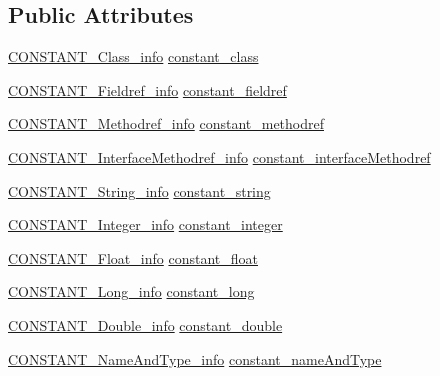 \subsection*{Public Attributes}
\begin{DoxyCompactItemize}
\item 
\hyperlink{structs_8hpp_afce1973b88cef62148562ed37fbbdfec}{C\+O\+N\+S\+T\+A\+N\+T\+\_\+\+Class\+\_\+info} \hyperlink{unioncp__info__u_aa80a68381f1daf2ccf6ac2ee5ce9b602}{constant\+\_\+class}
\item 
\hyperlink{structs_8hpp_a5b79c4752ea4a4e4880f374239e23104}{C\+O\+N\+S\+T\+A\+N\+T\+\_\+\+Fieldref\+\_\+info} \hyperlink{unioncp__info__u_a18be3ffc26ebc8887f507dd9e6cb756c}{constant\+\_\+fieldref}
\item 
\hyperlink{structs_8hpp_a11dfb795f76c8ae500e5652924ba7289}{C\+O\+N\+S\+T\+A\+N\+T\+\_\+\+Methodref\+\_\+info} \hyperlink{unioncp__info__u_a1b1c3cd5733f2a29bb0e2814b67f168d}{constant\+\_\+methodref}
\item 
\hyperlink{structs_8hpp_a5d8a806561391610f7092cae2e9fbdca}{C\+O\+N\+S\+T\+A\+N\+T\+\_\+\+Interface\+Methodref\+\_\+info} \hyperlink{unioncp__info__u_a15e8972d564add1f129d469b54efb8b6}{constant\+\_\+interface\+Methodref}
\item 
\hyperlink{structs_8hpp_a98fe2dcb4f443548bca1e1ba4750551d}{C\+O\+N\+S\+T\+A\+N\+T\+\_\+\+String\+\_\+info} \hyperlink{unioncp__info__u_acd87a20b30ed9024d98239c3cd14b0f9}{constant\+\_\+string}
\item 
\hyperlink{structs_8hpp_a787b138703e5fbe6f5899de13d7dcb63}{C\+O\+N\+S\+T\+A\+N\+T\+\_\+\+Integer\+\_\+info} \hyperlink{unioncp__info__u_aef67ff0a71fe8f3a8a6f276c0e177c9c}{constant\+\_\+integer}
\item 
\hyperlink{structs_8hpp_af49965517a6dbed7ccaeeae09beb251a}{C\+O\+N\+S\+T\+A\+N\+T\+\_\+\+Float\+\_\+info} \hyperlink{unioncp__info__u_a14b943c747f6aa0fe799739608439fd9}{constant\+\_\+float}
\item 
\hyperlink{structs_8hpp_a0664b73f95a5ba329c2f70bf22c70cb8}{C\+O\+N\+S\+T\+A\+N\+T\+\_\+\+Long\+\_\+info} \hyperlink{unioncp__info__u_aac563b3b1991dd783a7dcf8734cc7b68}{constant\+\_\+long}
\item 
\hyperlink{structs_8hpp_a2c42e32589ba5c1bb09cabcadcb0f96c}{C\+O\+N\+S\+T\+A\+N\+T\+\_\+\+Double\+\_\+info} \hyperlink{unioncp__info__u_a564a2f753c2487b102b95c993596a103}{constant\+\_\+double}
\item 
\hyperlink{structs_8hpp_ab09f323602f4043c3f40d009f3f3b84c}{C\+O\+N\+S\+T\+A\+N\+T\+\_\+\+Name\+And\+Type\+\_\+info} \hyperlink{unioncp__info__u_a238fa508b12d3cba9a428ac2b8183eff}{constant\+\_\+name\+And\+Type}

\end{DoxyCompactItemize}
